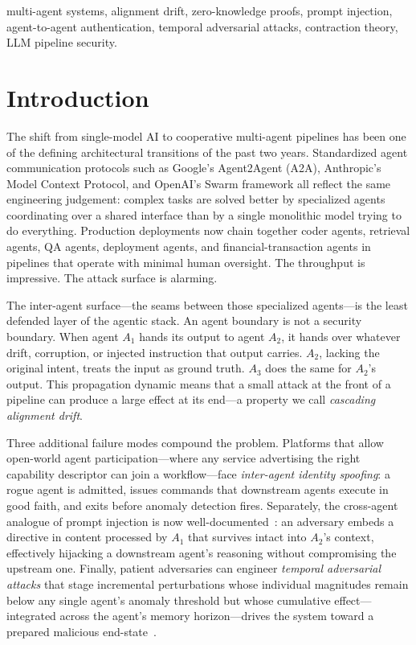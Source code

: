 \documentclass[conference]{IEEEtran}
\begin{document}
\begin{IEEEkeywords}
multi-agent systems, alignment drift, zero-knowledge proofs, prompt
injection, agent-to-agent authentication, temporal adversarial attacks,
contraction theory, LLM pipeline security.
\end{IEEEkeywords}

\section{Introduction}
\label{sec:intro}

The shift from single-model AI to cooperative multi-agent pipelines has
been one of the defining architectural transitions of the past two years.
Standardized agent communication protocols such as Google's Agent2Agent
(A2A), Anthropic's Model Context Protocol, and OpenAI's Swarm framework
all reflect the same
engineering judgement: complex tasks are solved better by specialized
agents coordinating over a shared interface than by a single monolithic
model trying to do everything. Production deployments now chain together
coder agents, retrieval agents, QA agents, deployment agents, and
financial-transaction agents in pipelines that operate with minimal human
oversight. The throughput is impressive. The attack surface is alarming.

The inter-agent surface---the seams between those specialized agents---is
the least defended layer of the agentic stack. An agent boundary is not a
security boundary. When agent $A_1$ hands its output to agent $A_2$, it
hands over whatever drift, corruption, or injected instruction that output
carries. $A_2$, lacking the original intent, treats the input as ground
truth. $A_3$ does the same for $A_2$'s output. This propagation dynamic
means that a small attack at the front of a pipeline can produce a large
effect at its end---a property we call \emph{cascading alignment drift}.

Three additional failure modes compound the problem. Platforms that allow
open-world agent participation---where any service advertising the right
capability descriptor can join a workflow---face \emph{inter-agent
identity spoofing}: a rogue agent is admitted, issues commands that
downstream agents execute in good faith, and exits before anomaly
detection fires. Separately, the cross-agent analogue of prompt injection
is now well-documented~\cite{ref:promptinfection2024}: an adversary
embeds a directive in content processed by $A_1$ that survives intact
into $A_2$'s context, effectively hijacking a downstream agent's
reasoning without compromising the upstream one. Finally, patient
adversaries can engineer \emph{temporal adversarial attacks} that stage
incremental perturbations whose individual magnitudes remain below any
single agent's anomaly threshold but whose cumulative effect---integrated
across the agent's memory horizon---drives the system toward a prepared
malicious end-state~\cite{ref:agentpoison2024}.
\end{document}
